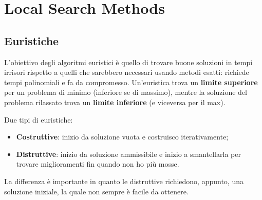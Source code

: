 \section{Local Search Methods}
\subsection{Euristiche}
L'obiettivo degli algoritmi euristici è quello di trovare buone soluzioni in tempi irrisori rispetto a quelli che sarebbero necessari usando metodi esatti: richiede tempi polinomiali e fa da compromesso. Un'euristica trova un \textbf{limite superiore} per un problema di minimo (inferiore se di massimo), mentre la soluzione del problema rilassato trova un \textbf{limite inferiore} (e viceversa per il max).

Due tipi di euristiche:
\begin{itemize}
	\item \textbf{Costruttive}: inizio da soluzione vuota e costruisco iterativamente;
	\item \textbf{Distruttive}: inizio da soluzione ammissibile e inizio a smantellarla per trovare miglioramenti fin quando non ho più mosse.
\end{itemize}

La differenza è importante in quanto le distruttive richiedono, appunto, una soluzione iniziale, la quale non sempre è facile da ottenere.

